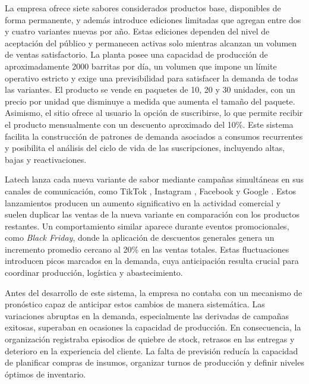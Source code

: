 La empresa ofrece siete sabores considerados productos base, disponibles de forma permanente, y además introduce ediciones limitadas que agregan entre dos y cuatro variantes nuevas por año. Estas ediciones dependen del nivel de aceptación del público y permanecen activas solo mientras alcanzan un volumen de ventas satisfactorio. La planta posee una capacidad de producción de aproximadamente 2000 barritas por día, un volumen que impone un límite operativo estricto y exige una previsibilidad para satisfacer la demanda de todas las variantes. El producto se vende en paquetes de 10, 20 y 30 unidades, con un precio por unidad que disminuye a medida que aumenta el tamaño del paquete. Asimismo, el sitio ofrece al usuario la opción de suscribirse, lo que permite recibir el producto mensualmente con un descuento aproximado del 10\%. Este sistema facilita la construcción de patrones de demanda asociados a consumos recurrentes y posibilita el análisis del ciclo de vida de las suscripciones, incluyendo altas, bajas y reactivaciones.

Latech lanza cada nueva variante de sabor mediante campañas simultáneas en sus canales de comunicación, como TikTok \citep{tiktokAds}, Instagram \citep{InstagramAds}, Facebook \citep{FacebookAds} y Google \citep{GoogleAds}. Estos lanzamientos producen un aumento significativo en la actividad comercial y suelen duplicar las ventas de la nueva variante en comparación con los productos restantes. Un comportamiento similar aparece durante eventos promocionales, como \textit{Black Friday}, donde la aplicación de descuentos generales genera un incremento promedio cercano al 20\% en las ventas totales. Estas fluctuaciones introducen picos marcados en la demanda, cuya anticipación resulta crucial para coordinar producción, logística y abastecimiento.

Antes del desarrollo de este sistema, la empresa no contaba con un mecanismo de pronóstico capaz de anticipar estos cambios de manera sistemática. Las variaciones abruptas en la demanda, especialmente las derivadas de campañas exitosas, superaban en ocasiones la capacidad de producción. En consecuencia, la organización registraba episodios de quiebre de stock, retrasos en las entregas y deterioro en la experiencia del cliente. La falta de previsión reducía la capacidad de planificar compras de insumos, organizar turnos de producción y definir niveles óptimos de inventario.

